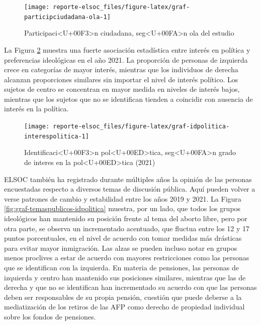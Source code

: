 \documentclass[
  12pt,
]{book}
\begin{document}
\begin{figure}

{\centering \texttt{[image: reporte-elsoc\_files/figure-latex/graf-participciudadana-ola-1]} 

}

\caption{Participaci<U+00F3>n ciudadana, seg<U+00FA>n ola del estudio}\label{fig:graf-participciudadana-ola}
\end{figure}

La Figura \ref{fig:graf-idpolitica-interespolitica} muestra una fuerte asociación estadística entre interés en política y preferencias ideológicas en el año 2021. La proporción de personas de izquierda crece en categorías de mayor interés, mientras que los individuos de derecha alcanzan proporciones similares sin importar el nivel de interés político. Los sujetos de centro se concentran en mayor medida en niveles de interés bajos, mientras que los sujetos que no se identifican tienden a coincidir con ausencia de interés en la política.

\begin{figure}

{\centering \texttt{[image: reporte-elsoc\_files/figure-latex/graf-idpolitica-interespolitica-1]} 

}

\caption{Identificaci<U+00F3>n pol<U+00ED>tica, seg<U+00FA>n grado de interes en la pol<U+00ED>tica (2021)}\label{fig:graf-idpolitica-interespolitica}
\end{figure}

ELSOC también ha registrado durante múltiples años la opinión de las personas encuestadas respecto a diversos temas de discusión pública. Aquí pueden volver a verse patrones de cambio y estabilidad entre los años 2019 y 2021. La Figura \ref{fig:graf-temaspublicos-idpolitica} muestra, por un lado, que todos los grupos ideológicos han mantenido su posición frente al tema del aborto libre, pero por otra parte, se observa un incrementado acentuado, que fluctua entre los 12 y 17 puntos porcentuales, en el nivel de acuerdo con tomar medidas más drásticas para evitar mayor inmigración. Las alzas se pueden incluso notar en grupos menos proclives a estar de acuerdo con mayores restricciones como las personas que se identifican con la izquierda. En materia de pensiones, las personas de izquierda y centro han mantenido sus posiciones similares, mientras que las de derecha y que no se identifican han incrementado su acuerdo con que las personas deben ser responsables de su propia pensión, cuestión que puede deberse a la mediatización de los retiros de las AFP como derecho de propiedad individual sobre los fondos de pensiones.
\end{document}
